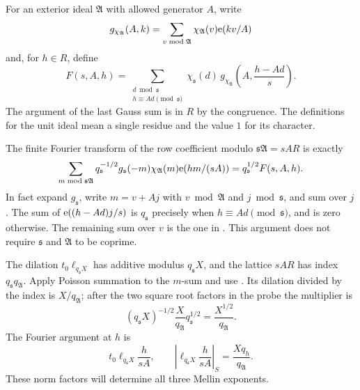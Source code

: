 For an exterior ideal \(\mathfrak A\) with allowed generator \(A\), write
\[
 g_{\chi_{\mathfrak A}}(A,k)
   =\sum_{v\bmod\mathfrak A}\chi_{\mathfrak A}(v)\mathrm{e}(kv/A)
\]
and, for \(h\in R\), define
\begin{equation}
 F(s,A,h)=
 \sum_{\substack{d\bmod\mathfrak s\\h\equiv Ad\pmod{\mathfrak s}}}
 \chi_{\mathfrak s}(d)\,
 g_{\chi_{\mathfrak A}}\!\left(A,\frac{h-Ad}{s}\right).
\label{eq:finite-Poisson-factor}
\end{equation}
The argument of the last Gauss sum is in \(R\) by the congruence.  The
definitions for the unit ideal mean a single residue and the value \(1\)
for its character.

The finite Fourier transform of the row coefficient modulo
\(\mathfrak s\mathfrak A=sAR\) is exactly
\begin{equation}
 \sum_{m\bmod\mathfrak s\mathfrak A}
 q_{\mathfrak s}^{-1/2}g_{\mathfrak s}(-m)
 \chi_{\mathfrak A}(m)\mathrm{e}(hm/(sA))
       =q_{\mathfrak s}^{1/2}F(s,A,h).
\label{eq:finite-Poisson-transform}
\end{equation}
In fact expand \(g_{\mathfrak s}\), write \(m=v+Aj\) with
\(v\bmod\mathfrak A\) and \(j\bmod\mathfrak s\), and sum over \(j\).
The sum of \(\mathrm{e}((h-Ad)j/s)\) is \(q_{\mathfrak s}\) precisely when
\(h\equiv Ad\pmod{\mathfrak s}\), and is zero otherwise.  The remaining
sum over \(v\) is the one in .  This
argument does not require \(\mathfrak s\) and \(\mathfrak A\) to be
coprime.

The dilation \(t_0\ell_{q_{\mathfrak s}X}\) has additive modulus
\(q_{\mathfrak s}X\), and the lattice \(sAR\) has index
\(q_{\mathfrak s}q_{\mathfrak A}\).  Apply Poisson summation to the
\(m\)-sum and use .  Its dilation divided
by the index is \(X/q_{\mathfrak A}\); after the two square root factors
in the probe the multiplier is
\[
 (q_{\mathfrak s}X)^{-1/2}
       \frac X{q_{\mathfrak A}}q_{\mathfrak s}^{1/2}
       =\frac{X^{1/2}}{q_{\mathfrak A}}.
\]
The Fourier argument at \(h\) is
\[
 t_0\ell_{q_{\mathfrak s}X}\frac h{sA},\qquad
 \left|\ell_{q_{\mathfrak s}X}\frac h{sA}\right|_S
       =\frac{Xq_h}{q_{\mathfrak A}}.
\]
These norm factors will determine all three Mellin exponents.


